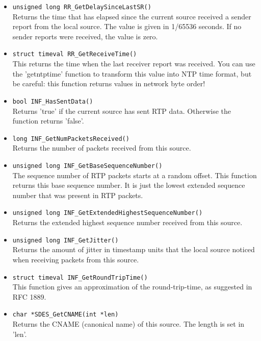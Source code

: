 \begin{itemize}
\item {\tt unsigned long RR\_GetDelaySinceLastSR()}\\
	Returns the time that has elapsed since the current source received
	a sender report from the local source. The value is given in
	1/65536 seconds. If no sender reports were received, the value is
	zero.

\item {\tt struct timeval RR\_GetReceiveTime()}\\
 	This returns the time when the last receiver report was received. You
 	can use the 'getntptime' function to transform this value into NTP
 	time format, but be careful: this function returns values in network
 	byte order!
 	
\item {\tt bool INF\_HasSentData()}\\
	Returns 'true' if the current source has sent RTP data. Otherwise
	the function returns 'false'.

\item {\tt long INF\_GetNumPacketsReceived()}\\
	Returns the number of packets received from this source.

\item {\tt unsigned long INF\_GetBaseSequenceNumber()}\\
	The sequence number of RTP packets starts at a random offset. This
	function returns this base sequence number. It is just the lowest
	extended sequence number that was present in RTP packets.

\item {\tt unsigned long INF\_GetExtendedHighestSequenceNumber()}\\
	Returns the extended highest sequence number received from this
	source.
	
\item {\tt unsigned long INF\_GetJitter()}\\
	Returns the amount of jitter in timestamp units that the local
	source noticed when receiving packets from this source.
	
\item {\tt struct timeval INF\_GetRoundTripTime()}\\
	This function gives an approximation of the round-trip-time, as
	suggested in RFC 1889.

\item {\tt char *SDES\_GetCNAME(int *len)}\\
	Returns the CNAME (canonical name) of this source. The length is
	set in 'len'.


\end{itemize}
